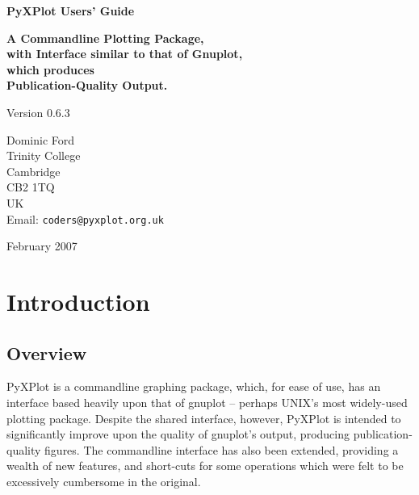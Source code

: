 \documentclass[a4paper,onecolumn,11pt]{book}
\def\version{0.6.3}
\def\reldate{February 2007}
\begin{document}
\begin{titlepage}
\normalsize
\vspace*{4.0cm}
\begin{center}
{\Huge \bf PyXPlot Users' Guide}\\
\end{center}
\medskip
\medskip
\begin{center}
{\LARGE \bf A Commandline Plotting Package, \\ \vspace{2mm} with Interface similar to that of Gnuplot, \\ \vspace{2mm} which produces \\ \vspace{2mm} Publication-Quality Output. \\}
\end{center}
\medskip
\medskip
\begin{center}
{\Large Version \version \\}
\end{center}
\bigskip
\vskip 2.5cm
\begin{center}
{Dominic Ford\\
Trinity College\\
Cambridge\\
CB2 1TQ\\
UK\\
Email: \noindent \texttt{coders@pyxplot.org.uk}}
\end{center}

\vfill
\bigskip
\begin{center}
{\Large \reldate \\}
\end{center}
\vfill
\end{titlepage}


\tableofcontents

\chapter{Introduction}

\label{introduction}

\section{Overview}

PyXPlot is a commandline graphing package, which, for ease of use, has an
interface based heavily upon that of gnuplot -- perhaps UNIX's most widely-used
plotting package. Despite the shared interface, however, PyXPlot is intended to
significantly improve upon the quality of gnuplot's output, producing
publication-quality figures. The commandline interface has also been extended,
providing a wealth of new features, and short-cuts for some operations which
were felt to be excessively cumbersome in the original.
\end{document}
